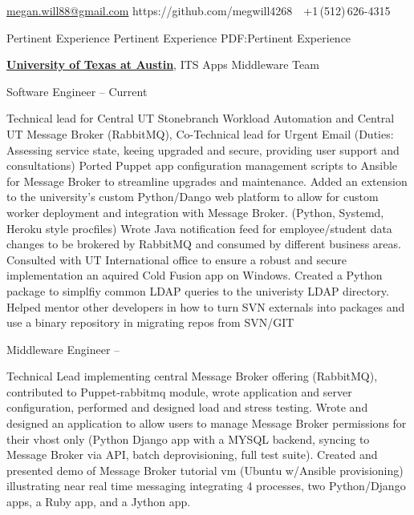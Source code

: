\documentclass[letterpaper,MMMyyyy,nonstopmode]{simpleresumecv}
\newcommand{\ResumeAuthor}{Megan Will}
\begin{document}

\Title{\ResumeAuthor}
\begin{SubTitle}
\href{mailto:megan.will88@gmail.com}{megan.will88@gmail.com}
https://github.com/megwill4268
\,\SubBulletSymbol\,
+1\,(512)\,626-4315
\end{SubTitle}
\begin{Body}


\Section
{Pertinent Experience}
{Pertinent Experience}
{PDF:Pertinent Experience}

\Entry
\href{http://www.utexas.edu/}
{\textbf{University of Texas at Austin}},
ITS Apps Middleware Team 

\Gap
\BulletItem
Software Engineer
\hfill
{} -- Current
\begin{Detail}
\SubBulletItem
Technical lead for Central UT Stonebranch Workload Automation and Central UT Message Broker (RabbitMQ), Co-Technical lead for Urgent Email  (Duties: Assessing service state, keeing upgraded and secure, providing user support and consultations)
\SubBulletItem
Ported Puppet app configuration management scripts to Ansible for Message Broker to streamline upgrades and maintenance. 
\SubBulletItem
Added an extension to the university's custom Python/Dango web platform to allow for custom worker deployment and integration with Message Broker. (Python, Systemd, Heroku style procfiles)
\SubBulletItem
Wrote Java notification feed for employee/student data changes to be brokered by RabbitMQ and consumed by different business areas. 
\SubBulletItem
Consulted with UT International office to ensure a robust and secure implementation an aquired Cold Fusion app on Windows.
\SubBulletItem
Created a Python package to simplfiy common LDAP queries to the univeristy LDAP directory. 
\SubBulletItem
Helped mentor other developers in how to turn SVN externals into packages and use a binary repository in migrating repos from SVN/GIT 
\end{Detail}

\Gap
\BulletItem
Middleware Engineer
\hfill
{} --
\begin{Detail}
\SubBulletItem
Technical Lead implementing central Message Broker offering (RabbitMQ), contributed to Puppet-rabbitmq module, wrote application and server configuration, performed and designed load and stress testing. 
\SubBulletItem
Wrote and designed an application to allow users to manage Message Broker permissions for their vhost only (Python Django app with a MYSQL backend, syncing to Message Broker via API, batch deprovisioning, full test suite).
\SubBulletItem
Created and presented demo of Message Broker tutorial vm (Ubuntu w/Ansible provisioning) illustrating near real time messaging integrating 4 processes, two Python/Django apps, a Ruby app, and a Jython app.
\end{Detail}


\end{Body}
\end{document}

